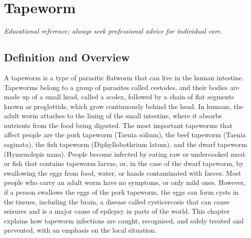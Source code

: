 \chapter{Tapeworm}

\medskip
\noindent\textit{Educational reference; always seek professional advice for individual care.}

\section*{Definition and Overview}
A tapeworm is a type of parasitic flatworm that can live in the human intestine. Tapeworms belong to a group of parasites called cestodes, and their bodies are made up of a small head, called a scolex, followed by a chain of flat segments known as proglottids, which grow continuously behind the head. In humans, the adult worm attaches to the lining of the small intestine, where it absorbs nutrients from the food being digested. The most important tapeworms that affect people are the pork tapeworm (Taenia solium), the beef tapeworm (Taenia saginata), the fish tapeworm (Diphyllobothrium latum), and the dwarf tapeworm (Hymenolepis nana). People become infected by eating raw or undercooked meat or fish that contains tapeworm larvae, or, in the case of the dwarf tapeworm, by swallowing the eggs from food, water, or hands contaminated with faeces. Most people who carry an adult worm have no symptoms, or only mild ones. However, if a person swallows the eggs of the pork tapeworm, the eggs can form cysts in the tissues, including the brain, a disease called cysticercosis that can cause seizures and is a major cause of epilepsy in parts of the world. This chapter explains how tapeworm infections are caught, recognised, and safely treated and prevented, with an emphasis on the local situation.

